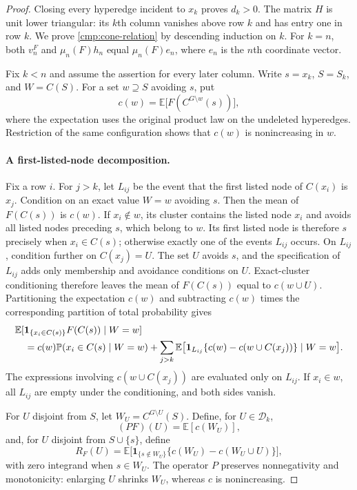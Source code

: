 \begin{proof}
Closing every hyperedge incident to $x_k$ proves $d_k>0$. The matrix $H$
is unit lower triangular: its $k$th column vanishes above row $k$ and has
entry one in row $k$. We prove \eqref{cmp:cone-relation} by descending
induction on $k$. For $k=n$, both $v_n^F$ and $\mu_n(F)h_n$ equal
$\mu_n(F)e_n$, where $e_n$ is the $n$th coordinate vector.

Fix $k<n$ and assume the assertion for every later column. Write
$s=x_k$, $S=S_k$, and $W=C(S)$. For a set $w\supseteq S$ avoiding $s$, put
\[
 c(w)=\mathbb E\bigl[F(C^{G\setminus w}(s))\bigr],
\]
where the expectation uses the original product law on the undeleted
hyperedges. Restriction of the same configuration shows that $c(w)$ is
nonincreasing in $w$.

\paragraph{A first-listed-node decomposition.}
Fix a row $i$. For $j>k$, let $L_{ij}$ be the event that the first listed
node of $C(x_i)$ is $x_j$.
Condition on an exact value $W=w$ avoiding $s$. Then the mean of $F(C(s))$
is $c(w)$. If $x_i\notin w$, its cluster contains the listed node $x_i$
and avoids all listed nodes preceding $s$, which belong to $w$.
Its first listed node is therefore $s$ precisely when $x_i\in C(s)$;
otherwise exactly one of the events $L_{ij}$ occurs.
On $L_{ij}$, condition further on $C(x_j)=U$. The set $U$ avoids $s$, and
the specification of $L_{ij}$ adds only membership and avoidance conditions
on $U$. Exact-cluster conditioning therefore leaves the mean of $F(C(s))$
equal to $c(w\cup U)$. Partitioning the expectation $c(w)$ and subtracting
$c(w)$ times the corresponding partition of total probability gives
\begin{align}
 &\mathbb E[\mathbf 1_{\{x_i\in C(s)\}}F(C(s))\mid W=w]
 \notag\\
 &\quad=c(w)\mathbb P(x_i\in C(s)\mid W=w)
   +\sum_{j>k}\mathbb E\bigl[
       \mathbf 1_{L_{ij}}\{c(w)-c(w\cup C(x_j))\}\mid W=w\bigr].
 \label{cmp:partition}
\end{align}
The expressions involving $c(w\cup C(x_j))$ are evaluated only on
$L_{ij}$. If $x_i\in w$, all $L_{ij}$ are empty under the conditioning,
and both sides vanish.

For $U$ disjoint from $S$, let
$W_U=C^{G\setminus U}(S)$. Define, for $U\in\mathcal D_k$,
\[
 (PF)(U)=\mathbb E[c(W_U)],
\]
and, for $U$ disjoint from $S\cup\{s\}$, define
\begin{equation}\label{cmp:residual}
 R_F(U)=\mathbb E\bigl[
   \mathbf 1_{\{s\notin W_U\}}
   \{c(W_U)-c(W_U\cup U)\}\bigr],
\end{equation}
with zero integrand when $s\in W_U$. The operator $P$ preserves
nonnegativity and monotonicity: enlarging $U$ shrinks $W_U$, whereas $c$
is nonincreasing.


\end{proof}
